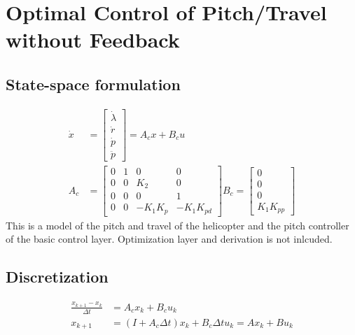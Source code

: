 \section{Optimal Control of Pitch/Travel without Feedback}\label{sec:prob2}

\subsection{State-space formulation}
\begin{equation}
\begin{aligned}
	\dot{x}&=\begin{bmatrix} \dot{\lambda} \\ \dot{r}  \\ \dot{p} \\ \ddot{p} \end{bmatrix}
	= A_cx + B_cu
	\\
	A_c &= \begin{bmatrix} 0 & 1 & 0 & 0 \\ 0 & 0 & K_2 & 0 \\ 0 & 0 & 0 & 1 \\ 0 & 0 & -K_1K_p & -K_1K_{pd} \end{bmatrix}
	B_c = \begin{bmatrix}0 \\ 0 \\ 0 \\K_1K_{pp} \end{bmatrix}
\end{aligned}
\end{equation}
This is a model of the pitch and travel of the helicopter and the pitch controller of the basic control layer. Optimization layer and derivation is not inlcuded.


\subsection{Discretization}
\begin{equation}
\begin{aligned}
	\frac{x_{k+1} - x_k}{\Delta t} &= A_c x_k + B_c u_k
	\\
	x_{k+1} &= (I + A_c \Delta t)x_k + B_c \Delta t u_k = Ax_k+Bu_k
\end{aligned}
\end{equation}

